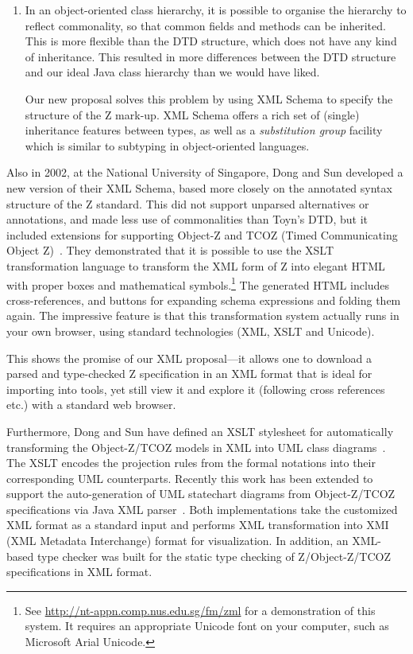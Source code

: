 \documentclass{llncs}  %
\begin{document}
\begin{enumerate}
\item In an object-oriented class hierarchy, it is possible to organise
  the hierarchy to reflect commonality, so that common fields and methods
  can be inherited.  This is more flexible than the DTD structure, which
  does not have any kind of inheritance.  This resulted in more differences
  between the DTD structure and our ideal Java class hierarchy than we
  would have liked. 

  Our new proposal solves this problem by using XML Schema to specify the
  structure of the Z mark-up.  XML Schema offers a rich set of (single)
  inheritance features between types, as well as a \emph{substitution
  group} facility which is similar to subtyping in object-oriented
  languages.  
\end{enumerate}


Also in 2002, at the National University of Singapore, Dong and Sun
developed a new version of their XML Schema, based more closely on
the annotated syntax structure of the Z standard.  This did not
support unparsed alternatives or annotations, and made less use of
commonalities than Toyn's DTD, but it included extensions 
for supporting Object-Z and TCOZ (Timed Communicating Object Z)~\cite{md99a}.
They demonstrated that it is possible to use the XSLT transformation
language to transform the XML form of Z into elegant HTML with proper boxes
and mathematical symbols.\footnote{
  See \url{http://nt-appn.comp.nus.edu.sg/fm/zml} for 
  a demonstration of this system.  It requires an appropriate Unicode
  font on your computer, such as Microsoft Arial Unicode.}
The generated HTML includes cross-references, and buttons for
expanding schema expressions and folding them again.  The impressive
feature is that this transformation system actually runs in your own
browser, using standard technologies (XML, XSLT and Unicode).

This shows the promise of our XML proposal---it allows one to download a parsed
and type-checked Z specification in an XML format that is ideal for
importing into tools, yet still view it and explore it (following
cross references etc.) with a standard web browser.

Furthermore, Dong and Sun have defined an XSLT stylesheet for
automatically transforming the Object-Z/TCOZ models in XML into UML
class diagrams~\cite{sd02}. The XSLT encodes the projection rules
from the formal notations into their corresponding UML
counterparts. Recently this work has been extended to support the
auto-generation of UML statechart diagrams from Object-Z/TCOZ
specifications via Java XML parser~\cite{dong02icfem}. Both
implementations take the customized XML format as a standard input and
performs XML transformation into XMI (XML Metadata Interchange) format
for visualization. In addition, an XML-based type checker was built
for the static type checking of Z/Object-Z/TCOZ specifications in XML
format.
\end{document}
